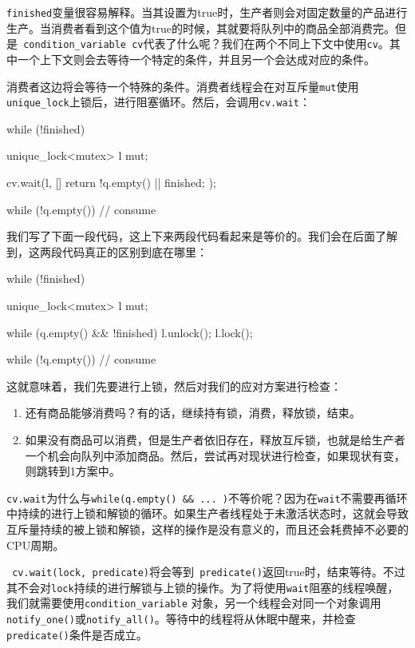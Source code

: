 \texttt{finished}变量很容易解释。当其设置为true时，生产者则会对固定数量的产品进行生产。当消费者看到这个值为true的时候，其就要将队列中的商品全部消费完。但是\texttt{ condition\_variable cv}代表了什么呢？我们在两个不同上下文中使用\texttt{cv}。其中一个上下文则会去等待一个特定的条件，并且另一个会达成对应的条件。

消费者这边将会等待一个特殊的条件。消费者线程会在对互斥量\texttt{mut}使用\texttt{unique\_lock}上锁后，进行阻塞循环。然后，会调用\texttt{cv.wait}：

\begin{codebox}[cpp]
while (!finished) {
    unique_lock<mutex> l {mut};
    
    cv.wait(l, [] { return !q.empty() || finished; });
    
    while (!q.empty()) {
        // consume
    }
}
\end{codebox}

我们写了下面一段代码，这上下来两段代码看起来是等价的。我们会在后面了解到，这两段代码真正的区别到底在哪里：

\begin{codebox}[cpp]
while (!finished) {
    unique_lock<mutex> l {mut};
    
    while (q.empty() && !finished) {
        l.unlock();
        l.lock();
    }
   
    while (!q.empty()) {
        // consume
    }
}
\end{codebox}

这就意味着，我们先要进行上锁，然后对我们的应对方案进行检查：

\begin{enumerate}
\item 还有商品能够消费吗？有的话，继续持有锁，消费，释放锁，结束。

\item 如果没有商品可以消费，但是生产者依旧存在，释放互斥锁，也就是给生产者一个机会向队列中添加商品。然后，尝试再对现状进行检查，如果现状有变，则跳转到1方案中。

\end{enumerate}

\texttt{cv.wait}为什么与\texttt{while(q.empty() \&\& ... )}不等价呢？因为在\texttt{wait}不需要再循环中持续的进行上锁和解锁的循环。如果生产者线程处于未激活状态时，这就会导致互斥量持续的被上锁和解锁，这样的操作是没有意义的，而且还会耗费掉不必要的CPU周期。

\texttt{ cv.wait(lock, predicate)}将会等到\texttt{ predicate()}返回true时，结束等待。不过其不会对\texttt{lock}持续的进行解锁与上锁的操作。为了将使用\texttt{wait}阻塞的线程唤醒，我们就需要使用\texttt{condition\_variable} 对象，另一个线程会对同一个对象调用\texttt{notify\_one()}或\texttt{notify\_all()}。等待中的线程将从休眠中醒来，并检查\texttt{predicate()}条件是否成立。

